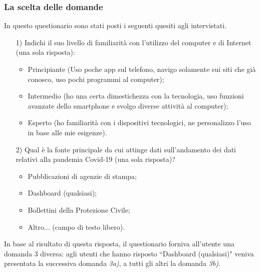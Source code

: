 \subsubsection{La scelta delle domande}
\label{sss:scelta-domande}
In questo questionario sono stati posti i seguenti quesiti agli intervistati.
\begin{itemize}
    \item[1)] Indichi il suo livello di familiarità con l'utilizzo del computer e di Internet (una sola risposta):
    \begin{itemize}
        \item Principiante (Uso poche app sul telefono, navigo solamente sui siti che già conosco, uso pochi programmi al computer);
        \item Intermedio (ho una certa dimestichezza con la tecnologia, uso funzioni avanzate dello smartphone e svolgo diverse attività al computer);
        \item Esperto (ho familiarità con i dispositivi tecnologici, ne personalizzo l'uso in base alle mie esigenze).
    \end{itemize}
    \item[2)] Qual è la fonte principale da cui attinge dati sull'andamento dei dati relativi alla pandemia Covid-19 (una sola risposta)?
    \begin{itemize}
        \item Pubblicazioni di agenzie di stampa;
        \item Dashboard (qualsiasi);
        \item Bollettini della Protezione Civile;
        \item Altro... (campo di testo libero).
    \end{itemize}
\end{itemize}
In base al risultato di questa risposta, il questionario forniva all'utente una domanda 3 diversa: agli utenti che hanno risposto ``Dashboard (qualsiasi)" veniva presentata la successiva domanda \textit{3a)}, a tutti gli altri la domanda \textit{3b)}.
